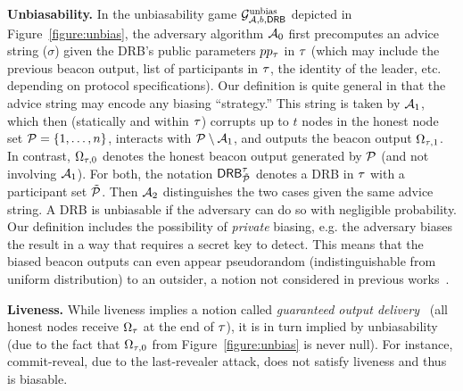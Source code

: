 \noindent\textbf{Unbiasability.}
In the unbiasability game $\mathcal{G}^\text{unbias}_{\mathcal{A}, b, \mathsf{DRB}}$ depicted in Figure~\ref{figure:unbias}, the adversary algorithm $\mathcal{A}_0$ first precomputes an advice string ($\sigma$) given the DRB's public parameters $pp_\tau$ in \epoch $\tau$ (which may include the previous beacon output, list of participants in \epoch $\tau$, the identity of the \epoch leader, etc. depending on protocol specifications).
Our definition is quite general in that the advice string may encode any biasing ``strategy.'' This string is taken by $\mathcal{A}_1$, which then (statically and within \epoch $\tau$) corrupts up to $t$ nodes in the honest node set $\mathcal{P} = \{1, \dots, n\}$, interacts with $\mathcal{P}\setminus\mathcal{A}_1$, and outputs the beacon output $\Omega_{\tau, 1}$.
In contrast, $\Omega_{\tau, 0}$ denotes the honest beacon output generated by $\mathcal{P}$ (and not involving $\mathcal{A}_1$).
For both, the notation $\mathsf{DRB}^\tau_{\tilde{\mathcal{P}}}$ denotes a DRB in \epoch $\tau$ with a participant set $\tilde{\mathcal{P}}$.
Then $\mathcal{A}_2$ distinguishes the two cases given the same advice string.
A DRB is unbiasable if the adversary can do so with negligible probability.
Our definition includes the possibility of \emph{private} biasing, e.g. the adversary biases the result in a way that requires a secret key to detect.
This means that the biased beacon outputs can even appear pseudorandom (indistinguishable from uniform distribution) to an outsider, a notion not considered in previous works~\cite{bonneau2015bitcoin,das2021spurt,bhat2020randpiper}.

\noindent\textbf{Liveness.}
While liveness implies a notion called \textit{guaranteed output delivery}~\cite{schindler2020hydrand,das2021spurt} (all honest nodes receive $\Omega_\tau$ at the end of \epoch $\tau$), it is in turn implied by unbiasability (due to the fact that $\Omega_{\tau, 0}$ from Figure~\ref{figure:unbias} is never null).
For instance, commit-reveal, due to the last-revealer attack, does not satisfy liveness and thus is biasable.

